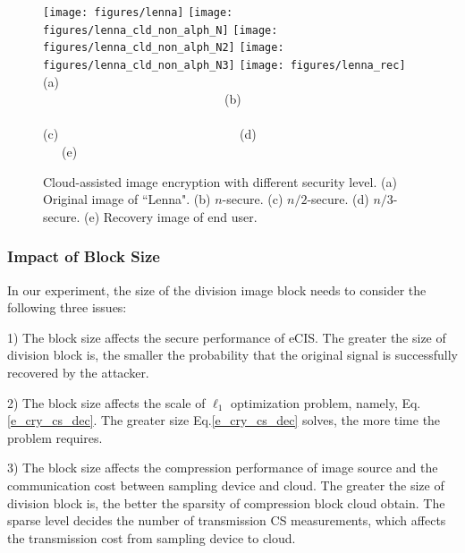 \documentclass[conference]{IEEEtran}
\begin{document}
\begin{figure*}[t]
\begin{center}
  \texttt{[image: figures/lenna]}
  \texttt{[image: figures/lenna\_cld\_non\_alph\_N]}
  \texttt{[image: figures/lenna\_cld\_non\_alph\_N2]}
  \texttt{[image: figures/lenna\_cld\_non\_alph\_N3]}
  \texttt{[image: figures/lenna\_rec]}\\
 {\footnotesize (a) ~~~~~~~~~~~~~~~~~~~~~~~~~~~~~(b)~~~~~~~~~~~~~~~~~~~~~~~~~~~~~ (c)~~~~~~~~~~~~~~~~~~~~~~~~~~~~~(d)~~~~~~~~~~~~~~~~~~~~~~~~~~~~~(e) }\\
  \caption{{\footnotesize Cloud-assisted image encryption with different security level. (a) Original image of ``Lenna". (b) $n$-secure. (c)  $n/2$-secure. (d)  $n/3$-secure. (e) Recovery image of end user.}}\label{f_se_uniform}
  \end{center}
\end{figure*}

\subsubsection{Impact of Block Size}
In our experiment, the size of the division image block needs to consider the following three issues:

 1) The block size affects the secure performance of eCIS. The greater the size of division block is, the smaller the probability that the original signal is successfully recovered by the attacker.

 2) The block size  affects the scale of $\ell_1$ optimization problem, namely, Eq.\ref{e_cry_cs_dec}. The greater size  Eq.\ref{e_cry_cs_dec}  solves, the more time the problem requires.

 3) The block size affects the compression performance of image source and the communication cost between sampling device and cloud. The greater the size of division block is, the better the sparsity of compression block cloud obtain. The sparse level decides the number of transmission CS measurements, which affects the transmission cost from sampling device to cloud.
\end{document}
